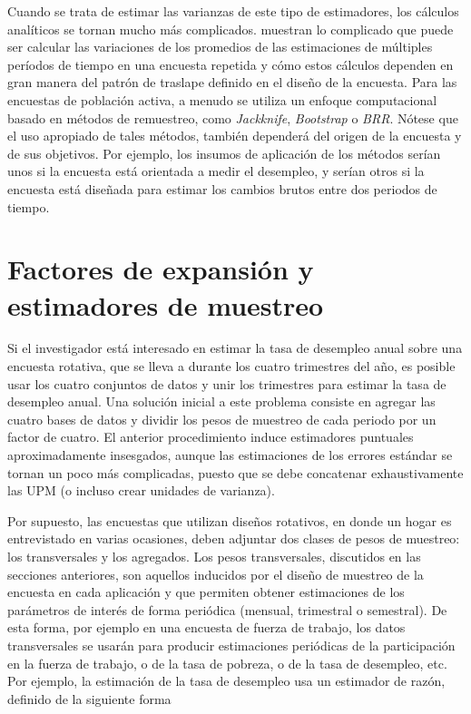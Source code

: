 \documentclass[
  12pt,
]{book}
\begin{document}
Cuando se trata de estimar las varianzas de este tipo de estimadores,
los cálculos analíticos se tornan mucho más complicados.
\citet{Train_Cahoon_Makens_1978} muestran lo complicado que puede ser calcular
las variaciones de los promedios de las estimaciones de múltiples
períodos de tiempo en una encuesta repetida y cómo estos cálculos
dependen en gran manera del patrón de traslape definido en el diseño de
la encuesta. Para las encuestas de población activa, a menudo se utiliza
un enfoque computacional basado en métodos de remuestreo, como
\emph{Jackknife}, \emph{Bootstrap} o \emph{BRR}. Nótese que el uso apropiado de tales
métodos, también dependerá del origen de la encuesta y de sus objetivos.
Por ejemplo, los insumos de aplicación de los métodos serían unos si la
encuesta está orientada a medir el desempleo, y serían otros si la encuesta
está diseñada para estimar los cambios brutos entre dos periodos de
tiempo.

\hypertarget{factores-de-expansiuxf3n-y-estimadores-de-muestreo}{%
\section{Factores de expansión y estimadores de muestreo}\label{factores-de-expansiuxf3n-y-estimadores-de-muestreo}}

Si el investigador está interesado en estimar la tasa de
desempleo anual sobre una encuesta rotativa, que se lleva a durante los cuatro trimestres del año, es posible usar los cuatro conjuntos de datos y unir los trimestres para estimar la tasa de desempleo anual. Una solución
inicial a este problema consiste en agregar las cuatro bases de datos y
dividir los pesos de muestreo de cada periodo por un factor de cuatro.
El anterior procedimiento induce estimadores puntuales aproximadamente
insesgados, aunque las estimaciones de los errores estándar se tornan un
poco más complicadas, puesto que se debe concatenar exhaustivamente las
UPM (o incluso crear unidades de varianza).

Por supuesto, las encuestas que utilizan diseños rotativos, en donde un
hogar es entrevistado en varias ocasiones, deben adjuntar dos clases de
pesos de muestreo: los transversales y los agregados. Los pesos
transversales, discutidos en las secciones anteriores, son aquellos
inducidos por el diseño de muestreo de la encuesta en cada aplicación y
que permiten obtener estimaciones de los parámetros de interés de forma
periódica (mensual, trimestral o semestral). De esta forma, por ejemplo
en una encuesta de fuerza de trabajo, los datos transversales se usarán
para producir estimaciones periódicas de la participación en la fuerza
de trabajo, o de la tasa de pobreza, o de la tasa de desempleo, etc. Por ejemplo, la estimación de la tasa de desempleo usa
un estimador de razón, definido de la siguiente forma
\end{document}
